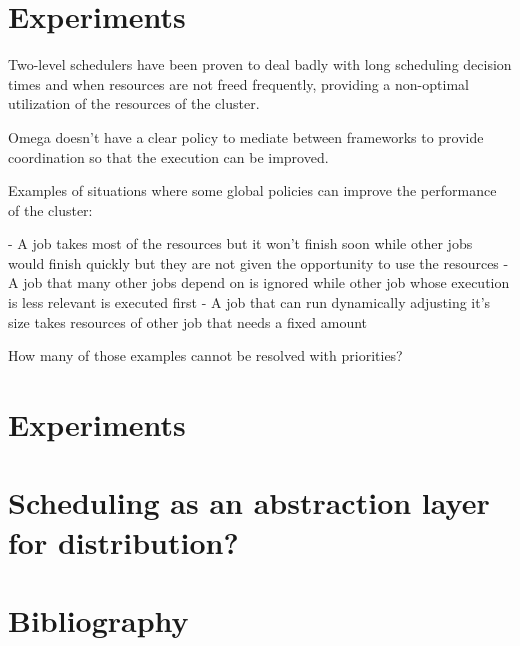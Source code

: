 \documentclass{svjour3}                     %
\begin{document}

\section{Experiments}
Two-level schedulers have been proven to deal badly with long scheduling decision times and
when resources are not freed frequently, providing a non-optimal utilization of the resources
of the cluster.

Omega doesn't have a clear policy to mediate between frameworks to provide coordination so 
that the execution can be improved.

Examples of situations where some global policies can improve the performance of the cluster:

 - A job takes most of the resources but it won't finish soon while other jobs would finish
   quickly but they are not given the opportunity to use the resources
 - A job that many other jobs depend on is ignored while other job whose execution is less
   relevant is executed first
 - A job that can run dynamically adjusting it's size takes resources of other job that needs
  a fixed amount

How many of those examples cannot be resolved with priorities? 


\section{Experiments}

\section{Scheduling as an abstraction layer for distribution?}





\section{Bibliography}


\printbibliography
\end{document}
